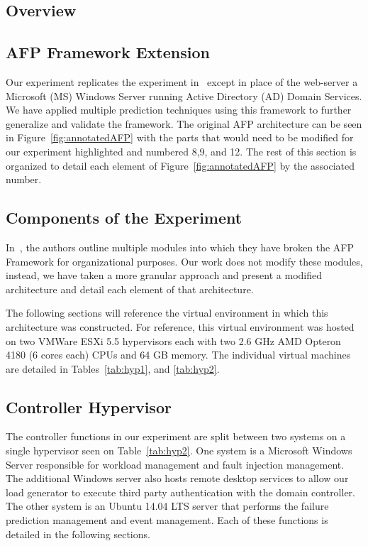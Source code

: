 \subsection{Overview}

\subsection{AFP Framework Extension}
Our experiment replicates the experiment in~\cite{irrera2015} except in place
of the web-server a Microsoft (MS) Windows Server running Active Directory (AD)
Domain Services.  We have applied multiple prediction techniques using this
framework to further generalize and validate the framework.  The original AFP
architecture can be seen in Figure~\ref{fig:annotatedAFP} with the parts that
would need to be modified for our experiment highlighted and numbered 8,9, and
12.  The rest of this section is organized to detail each element of
Figure~\ref{fig:annotatedAFP} by the associated number.

\subsection{Components of the Experiment}
In~\cite{irrera2015}, the authors outline multiple modules into which they have
broken the AFP Framework for organizational purposes.  Our work does not modify
these modules, instead, we have taken a more granular approach and present a
modified architecture and detail each element of that architecture.

\figannotatedAFP  

The following sections will reference the virtual environment in which this
architecture was constructed.  For reference, this virtual environment was
hosted on two VMWare ESXi 5.5 hypervisors each with two 2.6 GHz AMD Opteron
4180 (6 cores each) CPUs and 64 GB memory.  The individual virtual machines are
detailed in Tables~\ref{tab:hyp1}, and \ref{tab:hyp2}.

\tabHypervisorOne
\tabHypervisorTwo

\setcounter{secnumdepth}{5}

\subsection{Controller Hypervisor} \label{sec:controller} %
The controller functions in our experiment are split between two systems on a
single hypervisor seen on Table~\ref{tab:hyp2}.  One system is a Microsoft
Windows Server responsible for workload management and fault injection
management.  The additional Windows server also hosts remote desktop services
to allow our load generator to execute third party authentication with the
domain controller.  The other system is an Ubuntu 14.04 LTS server that
performs the failure prediction management and event management.  Each of
these functions is detailed in the following sections.

